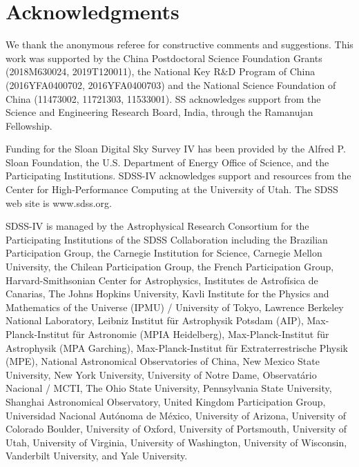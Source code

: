\documentclass[twocolumn]{aastex62}
\begin{document}
\section*{Acknowledgments}



We thank the anonymous referee for constructive comments
and suggestions.
This work was supported by the China Postdoctoral Science Foundation
Grants (2018M630024, 2019T120011), the National Key R\&D Program of
China (2016YFA0400702, 2016YFA0400703) and the National Science
Foundation of China (11473002, 11721303, 11533001). SS acknowledges
support from the Science and Engineering Research Board, India,
through the Ramanujan Fellowship.

Funding for the Sloan Digital Sky Survey IV has been provided by the
Alfred P. Sloan Foundation, the U.S. Department of Energy Office of
Science, and the Participating Institutions. SDSS-IV acknowledges
support and resources from the Center for High-Performance Computing
at the University of Utah. The SDSS web site is www.sdss.org.

SDSS-IV is managed by the Astrophysical Research Consortium for the
Participating Institutions of the SDSS Collaboration including the
Brazilian Participation Group, the Carnegie Institution for Science,
Carnegie Mellon University, the Chilean Participation Group, the
French Participation Group, Harvard-Smithsonian Center for
Astrophysics, Institutes de Astrof\'isica de Canarias, The Johns
Hopkins University, Kavli Institute for the Physics and Mathematics of
the Universe (IPMU) / University of Tokyo, Lawrence Berkeley National
Laboratory, Leibniz Institut f\"ur Astrophysik Potsdam (AIP),
Max-Planck-Institut f\"ur Astronomie (MPIA Heidelberg),
Max-Planck-Institut f\"ur Astrophysik (MPA Garching),
Max-Planck-Institut f\"ur Extraterrestrische Physik (MPE), National
Astronomical Observatories of China, New Mexico State University, New
York University, University of Notre Dame, Observat\'ario Nacional /
MCTI, The Ohio State University, Pennsylvania State University,
Shanghai Astronomical Observatory, United Kingdom Participation Group,
Universidad Nacional Aut\'onoma de M\'exico, University of Arizona,
University of Colorado Boulder, University of Oxford, University of
Portsmouth, University of Utah, University of Virginia, University of
Washington, University of Wisconsin, Vanderbilt University, and Yale
University. 
\end{document}
